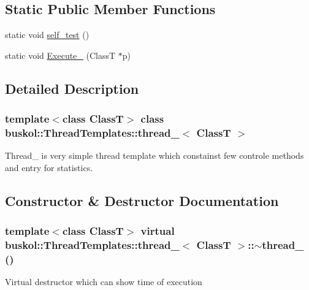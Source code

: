 \subsection*{Static Public Member Functions}
\begin{DoxyCompactItemize}
\item 
static void \hyperlink{classbuskol_1_1ThreadTemplates_1_1thread__1_ac33a5aa33679452b203c539401c92929}{self\_\-test} ()
\item 
static void \hyperlink{classbuskol_1_1ThreadTemplates_1_1thread__1_a37cde0d5c6105d9194ce1cf981cf9c5a}{Execute\_\-} (ClassT $\ast$p)
\end{DoxyCompactItemize}


\subsection{Detailed Description}
\subsubsection*{template$<$class ClassT$>$ class buskol::ThreadTemplates::thread\_$<$ ClassT $>$}

Thread\_ is very simple thread template which constainst few controle methods and entry for statistics. 

\subsection{Constructor \& Destructor Documentation}
\hypertarget{classbuskol_1_1ThreadTemplates_1_1thread__1_a7e53c5d7bef0898efc1c1bb217c6319a}{
\subsubsection[{$\sim$thread\_\-1}]{\setlength{\rightskip}{0pt plus 5cm}template$<$class ClassT$>$ virtual {\bf buskol::ThreadTemplates::thread\_}$<$ ClassT $>$::$\sim${\bf thread\_} ()}}
\label{classbuskol_1_1ThreadTemplates_1_1thread__1_a7e53c5d7bef0898efc1c1bb217c6319a}


Virtual destructor which can show time of execution 



